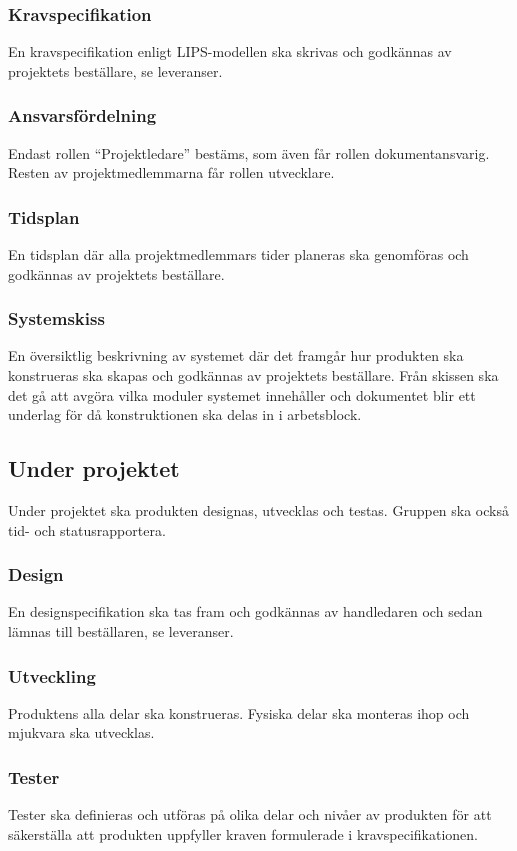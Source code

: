 \documentclass{article}
\begin{document}
\subsubsection{Kravspecifikation}
En kravspecifikation enligt LIPS-modellen ska skrivas och godkännas av projektets beställare, se leveranser.

\subsubsection{Ansvarsfördelning}
Endast rollen ``Projektledare'' bestäms, som även får rollen dokumentansvarig. Resten av projektmedlemmarna får rollen utvecklare.

\subsubsection{Tidsplan}
En tidsplan där alla projektmedlemmars tider planeras ska genomföras och godkännas av projektets beställare.

\subsubsection{Systemskiss}
En översiktlig beskrivning av systemet där det framgår hur produkten ska konstrueras ska skapas och godkännas av projektets beställare. Från skissen ska det gå att avgöra vilka moduler systemet innehåller och dokumentet blir ett underlag för då konstruktionen ska delas in i arbetsblock.

\subsection{Under projektet}
Under projektet ska produkten designas, utvecklas och testas. Gruppen ska också tid- och statusrapportera.

\subsubsection{Design}
En designspecifikation ska tas fram och godkännas av handledaren och sedan lämnas till beställaren, se leveranser.

\subsubsection{Utveckling}
Produktens alla delar ska konstrueras. Fysiska delar ska monteras ihop och mjukvara ska utvecklas.

\subsubsection{Tester}
Tester ska definieras och utföras på olika delar och nivåer av produkten för att säkerställa att produkten uppfyller kraven formulerade i kravspecifikationen.
\end{document}

